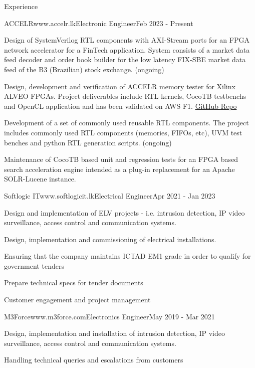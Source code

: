 \documentclass[
	11pt, %
]{./../assets/resume} %
\begin{document}
\begin{rSection}{Experience}

	\begin{rSubsectionX}{ACCELR}{www.accelr.lk}{Electronic Engineer}{Feb 2023 - Present}
		\item Design of SystemVerilog RTL components with AXI-Stream ports for an FPGA network accelerator for a FinTech application. System consists of a market data feed decoder and order book builder for the low latency FIX-SBE market data feed of the B3 (Brazilian) stock exchange. (ongoing) 
		\item Design, development and verification of ACCELR memory tester for Xilinx ALVEO FPGAs. Project deliverables include RTL kernels, CocoTB testbenchs and OpenCL application and has been validated on AWS F1. \href{https://github.com/accelr-net/alveo-memory-tester}{GitHub Repo}
		\item Development of a set of commonly used reusable RTL components. The project includes commonly used RTL components (memories, FIFOs, etc), UVM test benches and python RTL generation scripts. (ongoing)
		\item Maintenance of CocoTB based unit and regression tests for an FPGA based search acceleration engine intended as a plug-in replacement for an Apache SOLR-Lucene instance.  
	\end{rSubsectionX}

	\begin{rSubsectionX}{Softlogic IT}{www.softlogicit.lk}{Electrical Engineer}{Apr 2021 - Jan 2023}
		\item Design and implementation of ELV projects - i.e. intrusion detection, IP video surveillance, access control and communication systems.
		\item Design, implementation and commissioning of electrical installations. 
		\item Ensuring that the company maintains ICTAD EM1 grade in order to qualify for government tenders
		\item Prepare technical specs for tender documents
		\item Customer engagement and project management
	\end{rSubsectionX}

	\begin{rSubsectionX}{M3Force}{www.m3force.com}{Electronics Engineer}{May 2019 - Mar 2021}
		\item Design, implementation and installation of intrusion detection, IP video surveillance, access control and communication systems.
		\item Handling technical queries and escalations from customers 
	\end{rSubsectionX}


\end{rSection}
\end{document}
